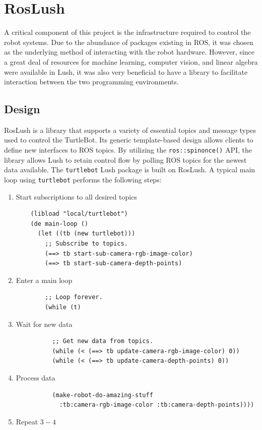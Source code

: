 \documentclass[letterpaper]{article}%
\begin{document}
\section{RosLush}
A critical component of this project is the infrastructure required to control
the robot systems. Due to the abundance of packages existing in ROS, it was
chosen as the underlying method of interacting with the robot hardware.
However, since a great deal of resources for machine learning, computer vision,
and linear algebra were available in Lush, it was also very beneficial to have
a library to facilitate interaction between the two programming environments.

\subsection{Design}
RosLush is a \cpp{} library that supports a variety of essential topics and
message types used to control the TurtleBot. Its generic \cpp{} template-based
design allows clients to define new interfaces to ROS topics. By utilizing the
{\tt ros::spinonce()} API, the library allows Lush to retain control flow by
polling ROS topics for the newest data available. The {\tt turtlebot} Lush
package is built on RosLush.  A typical main loop using {\tt turtlebot}
performs the following steps:
\begin{enumerate}
  \item Start subscriptions to all desired topics \vspace{-10.0 pt}
    \begin{verbatim}
    (libload "local/turtlebot")
    (de main-loop ()
      (let ((tb (new turtlebot)))
        ;; Subscribe to topics.
        (==> tb start-sub-camera-rgb-image-color)
        (==> tb start-sub-camera-depth-points)
    \end{verbatim}
    \vspace{-20.0 pt}
  \item Enter a main loop \vspace{-10.0 pt}
    \begin{verbatim}
        ;; Loop forever.
        (while (t)
    \end{verbatim}
    \vspace{-20.0 pt}
  \item Wait for new data \vspace{-10.0 pt}
    \begin{verbatim}
          ;; Get new data from topics.
          (while (< (==> tb update-camera-rgb-image-color) 0))
          (while (< (==> tb update-camera-depth-points) 0))
    \end{verbatim}
    \vspace{-20.0 pt}
  \item Process data \vspace{-10.0 pt}
    \begin{verbatim}
          (make-robot-do-amazing-stuff
            :tb:camera-rgb-image-color :tb:camera-depth-points))))
    \end{verbatim}
    \vspace{-20.0 pt}
  \item Repeat $3 - 4$
\end{enumerate}
\end{document}
